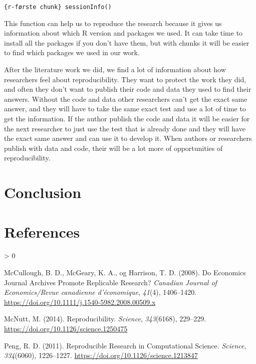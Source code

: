 \documentclass[
  12pt,
  norsk,
]{article}
\newlength{\cslhangindent}
\newenvironment{CSLReferences}[2] %
 {%
  \setlength{\parindent}{0pt}
  \ifodd #1 \everypar{\setlength{\hangindent}{\cslhangindent}}\ignorespaces\fi
  \ifnum #2 > 0
  \setlength{\parskip}{#2\baselineskip}
  \fi
 }%
 {}
\begin{document}
\texttt{\{r-første\ chunk\}\ sessionInfo()}

This function can help us to reproduce the research because it gives us
information about which R version and packages we used. It can take time
to install all the packages if you don't have them, but with chunks it
will be easier to find which packages we used in our work.

After the literature work we did, we find a lot of information about how
researchers feel about reproducibility. They want to protect the work
they did, and often they don't want to publish their code and data they
used to find their answers. Without the code and data other researchers
can't get the exact same answer, and they will have to take the same
exact test and use a lot of time to get the information. If the author
publish the code and data it will be easier for the next researcher to
just use the test that is already done and they will have the exact same
answer and can use it to develop it. When authors or researchers publish
with data and code, their will be a lot more of opportunities of
reproducibility.

\hypertarget{conclusion}{%
\section{Conclusion}\label{conclusion}}

\hypertarget{references}{%
\section*{References}\label{references}}

\hypertarget{refs}{}
\begin{CSLReferences}{1}{0}
\leavevmode\hypertarget{ref-mccullough2008}{}%
McCullough, B. D., McGeary, K. A., og Harrison, T. D. (2008). Do
Economics Journal Archives Promote Replicable Research? \emph{Canadian
Journal of Economics/Revue canadienne d'économique}, \emph{41}(4),
1406--1420. \url{https://doi.org/10.1111/j.1540-5982.2008.00509.x}

\leavevmode\hypertarget{ref-mcnutt2014}{}%
McNutt, M. (2014). Reproducibility. \emph{Science}, \emph{343}(6168),
229--229. \url{https://doi.org/10.1126/science.1250475}

\leavevmode\hypertarget{ref-peng2011}{}%
Peng, R. D. (2011). Reproducible {Research} in {Computational Science}.
\emph{Science}, \emph{334}(6060), 1226--1227.
\url{https://doi.org/10.1126/science.1213847}

\end{CSLReferences}
\end{document}
